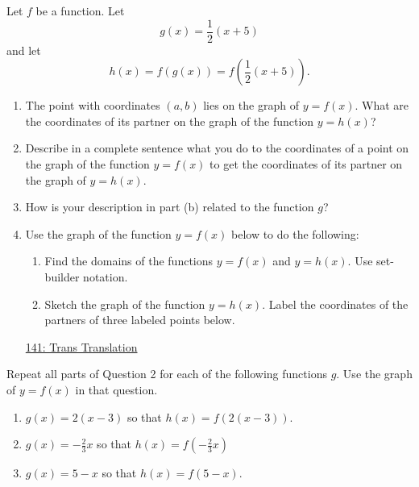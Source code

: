 \documentclass{ximera}
\begin{document}
\begin{question}  \label{Q9231m4e42}
Let $f$ be a function. Let
\[
     g(x) =  \frac{1}{2}\left(x+5\right)
\]
and let
\[
    h(x) = f  \left( g(x) \right) = f  \left( \frac{1}{2}\left(x+5\right) \right). 
\]

\begin{enumerate}
\item The point with coordinates $(a,b)$ lies on the graph of $y=f(x)$. What are the coordinates of its partner on the graph of the function $y=h(x)$?

\item Describe in a complete sentence what you do to the coordinates of a point on the graph of the function $y=f(x)$ to get the coordinates of its partner on the graph of $y=h(x)$.

\item How is your description in part (b) related to the function $g$?


\item Use the graph of the function $y=f(x)$ below to do the following:

\begin{enumerate}
\item Find the domains of the functions $y=f(x)$ and $y=h(x)$. Use set-builder notation.

\item Sketch the graph of the function $y=h(x)$. Label the coordinates of the partners of three labeled points below.

\end{enumerate}

\begin{onlineOnly}
    \begin{center}
\end{center}
\end{onlineOnly}

\href{https://www.desmos.com/calculator/c5di6pnyda}{141: Trans Translation}

\end{enumerate}
\end{question}


\begin{question} \label{Q9d9r3ce4e}
Repeat all parts of Question 2 for each of the following functions $g$. Use the graph of $y=f(x)$ in that question.

\begin{enumerate}
\item $g(x) = 2(x-3)$ so that $h(x) = f(2(x-3))$.

\item $g(x) = -\frac{2}{3} x$ so that $h(x) = f\left(  -\frac{2}{3} x \right)$

\item $g(x) = 5-x$ so that $h(x) = f\left( 5-x \right)$.


\end{enumerate}
\end{question}
\end{document}
